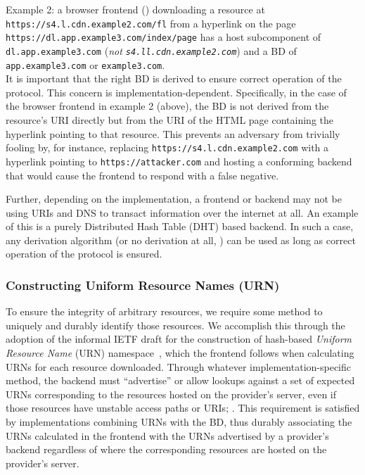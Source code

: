 Example 2: a browser frontend () downloading a resource at \texttt{https://s4.l.cdn.example2.com/fl}
from a hyperlink on the page \texttt{https://dl.app.example3.com/index/page} has
a host subcomponent of \texttt{dl.app.example3.com} (\emph{not
\texttt{s4.ll.cdn.example2.com}}) and a BD of \texttt{app.example3.com} or
\texttt{example3.com}. \\

It is important that the right BD is derived to ensure correct operation of the
protocol. This concern is implementation-dependent. Specifically, in the case of
the browser frontend in example 2 (above), the BD is not derived from the
resource's URI directly but from the URI of the HTML page containing the
hyperlink pointing to that resource. This prevents an adversary from trivially
fooling \SYSTEM{} by, for instance, replacing
\texttt{https://s4.l.cdn.example2.com} with a hyperlink pointing to
\texttt{https://attacker.com} and hosting a conforming \SYSTEM{} backend that
would cause the frontend to respond with a false negative.

Further, depending on the implementation, a frontend or backend may not be using
URIs and DNS to transact information over the internet at all. An example of
this is a purely Distributed Hash Table (DHT) based backend. In such a case, any
derivation algorithm (or no derivation at all, ) can be
used as long as correct operation of the protocol is ensured.

\subsubsection{Constructing Uniform Resource Names (URN)}

To ensure the integrity of arbitrary resources, we require some method to
uniquely and durably identify those resources. We accomplish this through the
adoption of the informal IETF draft for the construction of hash-based
\emph{Uniform Resource Name} (URN) namespace~\cite{draft-URN}, which the
frontend follows when calculating URNs for each resource downloaded. Through
whatever implementation-specific method, the backend must ``advertise'' or allow
lookups against a set of expected URNs corresponding to the resources hosted on
the provider's server, even if those resources have unstable access paths or
URIs; . This requirement is satisfied by implementations combining URNs with
the BD, thus durably associating the URNs calculated in the frontend with the
URNs advertised by a provider's backend regardless of where the corresponding
resources are hosted on the provider's server.

